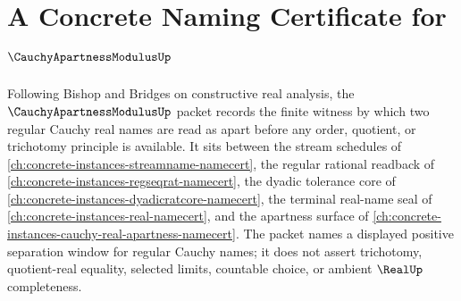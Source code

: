 \chapter{A Concrete Naming Certificate for $\CauchyApartnessModulusUp$}
\label{ch:concrete-instances-cauchy-apartness-modulus-namecert}

Following Bishop and Bridges on constructive real analysis, the $\CauchyApartnessModulusUp$ packet records the finite witness by which two regular Cauchy real names are read as apart before any order, quotient, or trichotomy principle is available. It sits between the stream schedules of \autoref{ch:concrete-instances-streamname-namecert}, the regular rational readback of \autoref{ch:concrete-instances-regseqrat-namecert}, the dyadic tolerance core of \autoref{ch:concrete-instances-dyadicratcore-namecert}, the terminal real-name seal of \autoref{ch:concrete-instances-real-namecert}, and the apartness surface of \autoref{ch:concrete-instances-cauchy-real-apartness-namecert}. The packet names a displayed positive separation window for regular Cauchy names; it does not assert trichotomy, quotient-real equality, selected limits, countable choice, or ambient $\RealUp$ completeness.

